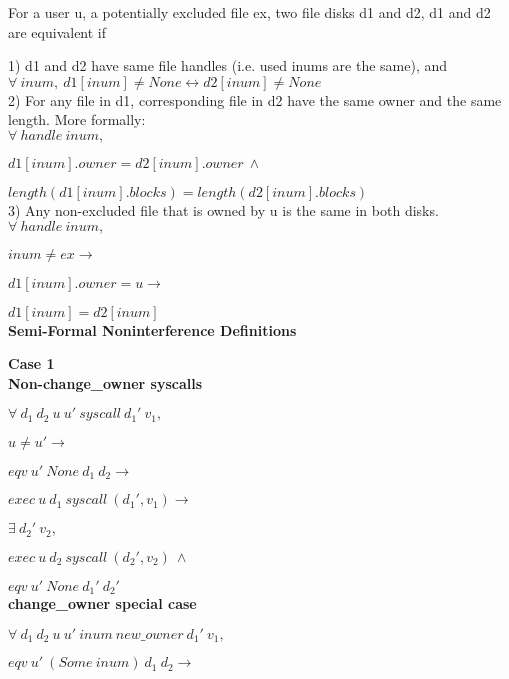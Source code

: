 \documentclass[onecolumn]{paper}
\begin{document}
			For a user u, a potentially excluded file ex, two file disks d1 and d2, 
			d1 and d2 are equivalent if
			
			1) d1 and d2 have same file handles (i.e. used inums are the same), and\\
			
			$\forall\ inum,\ d1[inum] \ne None \leftrightarrow d2[inum] \ne None$\\
			
			
			2) For any file in d1, corresponding file in d2 have the same owner and the same length. More formally:\\
			
			$\forall\ handle\ inum,$
			
			$d1[inum].owner = d2[inum].owner\ \wedge$
			 
			$length (d1[inum].blocks) = length (d2[inum].blocks)$\\
			
			3)  Any non-excluded file that is owned by u is the same in both disks. \\ 
			
			$\forall\ handle\ inum,$
			 
			$inum \ne ex \rightarrow$
			
			$d1[inum].owner = u \rightarrow$
			
			$d1[inum] = d2[inum]$\\
			
			
			{\bf Semi-Formal Noninterference Definitions}
			
			{\bf Case 1}\\
			
			{\bf Non-change\_owner syscalls}

			$\forall\ d_1\ d_2\ u\ u'\ syscall\ d_1'\ v_1,$
			
			$u \ne u' \rightarrow$
			
			$eqv\ u'\ None\ d_1\ d_2 \rightarrow$
			
			$exec\ u\ d_1\ syscall\ (d_1', v_1) \rightarrow$
			
			$\exists\ d_2'\ v_2,$
			
			$exec\ u\ d_2\ syscall\ (d_2', v_2)\ \wedge$
			
			$eqv\ u'\ None\ d_1'\ d_2'$\\
			
			
			{\bf change\_owner special case}
			
			$\forall\ d_1\ d_2\ u\ u'\ inum\ new\_owner\ d_1'\ v_1,$
			
			$eqv\ u'\ (Some\ inum)\ d_1\ d_2 \rightarrow$
			
\end{document}
